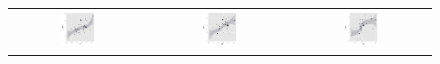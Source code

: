\documentclass[fleqn]{MJDArticle}
\begin{document}
\begin{figure}[H]
	\begin{tabular}{ccc}
		\includegraphics[width = 0.28\textwidth]{images/FF_FM.pdf} &
		\includegraphics[width = 0.28\textwidth]{images/FF_MF.pdf}&
		\includegraphics[width = 0.28\textwidth]{images/FM_MF.pdf}
	\end{tabular}
\end{figure}








\end{document}
